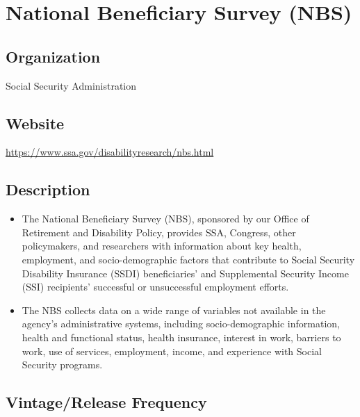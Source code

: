 \documentclass[
]{book}
\providecommand{\tightlist}{%
  \setlength{\itemsep}{0pt}\setlength{\parskip}{0pt}}
\begin{document}
\mainmatter

\hypertarget{national-beneficiary-survey-nbs}{%
\chapter{National Beneficiary Survey (NBS)}\label{national-beneficiary-survey-nbs}}

\hypertarget{organization-44}{%
\section{Organization}\label{organization-44}}

Social Security Administration

\hypertarget{website-44}{%
\section{Website}\label{website-44}}

\url{https://www.ssa.gov/disabilityresearch/nbs.html}

\hypertarget{description-44}{%
\section{Description}\label{description-44}}

\begin{itemize}
\tightlist
\item
  The National Beneficiary Survey (NBS), sponsored by our Office of Retirement and Disability Policy, provides SSA, Congress, other policymakers, and researchers with information about key health, employment, and socio-demographic factors that contribute to Social Security Disability Insurance (SSDI) beneficiaries' and Supplemental Security Income (SSI) recipients' successful or unsuccessful employment efforts.
\item
  The NBS collects data on a wide range of variables not available in the agency's administrative systems, including socio-demographic information, health and functional status, health insurance, interest in work, barriers to work, use of services, employment, income, and experience with Social Security programs.
\end{itemize}

\hypertarget{vintagerelease-frequency-44}{%
\section{Vintage/Release Frequency}\label{vintagerelease-frequency-44}}
\end{document}
